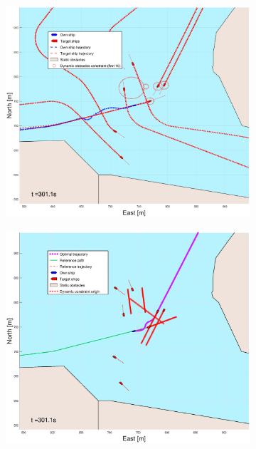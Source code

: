 \begin{figure}[ht]\ContinuedFloat
    \begin{subfigure}[b]{0.49\textwidth}
        \centering
        \includegraphics[width=\textwidth]{Images/Figures/Trheimfjord/_Simple_1fig1_time=301}
    \end{subfigure}
    \hfill
    \begin{subfigure}[b]{0.499\textwidth}
        \centering
        \includegraphics[width=\textwidth]{Images/Figures/Trheimfjord/_Simple_1fig999_time=301}

\end{subfigure}
\end{figure}
